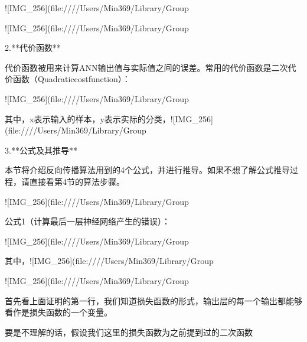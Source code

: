 ​![IMG_256](file:////Users/Min369/Library/Group%



​![IMG_256](file:////Users/Min369/Library/Group%



2.**代价函数**

​代价函数被用来计算ANN输出值与实际值之间的误差。常用的代价函数是二次代价函数（Quadraticcostfunction）：

​![IMG_256](file:////Users/Min369/Library/Group%





​其中，x表示输入的样本，y表示实际的分类，![IMG_256](file:////Users/Min369/Library/Group%



3.**公式及其推导**

本节将介绍反向传播算法用到的4个公式，并进行推导。如果不想了解公式推导过程，请直接看第4节的算法步骤。

![IMG_256](file:////Users/Min369/Library/Group%





公式1（计算最后一层神经网络产生的错误）：



​![IMG_256](file:////Users/Min369/Library/Group%

其中，![IMG_256](file:////Users/Min369/Library/Group%



![IMG_256](file:////Users/Min369/Library/Group%

首先看上面证明的第一行，我们知道损失函数的形式，输出层的每一个输出都能够看作是损失函数的一个变量。

要是不理解的话，假设我们这里的损失函数为之前提到过的二次函数

